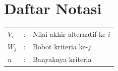 \chapter*{Daftar Notasi}
{}
\begin{tabular}{@{}p{2.5cm}@{}p{0.6cm}@{}p{\dimexpr\textwidth-3.1cm\relax}@{}}
  $V_i$ & : & Nilai akhir alternatif ke-$i$ \\
  $W_j$ & : & Bobot kriteria ke-$j$ \\
  $n$   & : & Banyaknya kriteria \\
\end{tabular}
\clearpage
